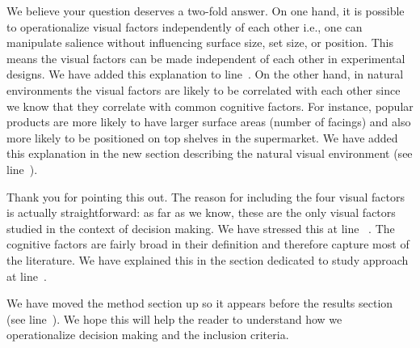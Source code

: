 
We believe your question deserves a two-fold answer. On one hand, it is possible to operationalize visual factors independently of each other i.e., one can manipulate salience without influencing surface size, set size, or position. This means the visual factors can be made independent of each other in experimental designs. We have added this explanation to line~. On the other hand, in natural environments the visual factors are likely to be correlated with each other since we know that they correlate with common cognitive factors. For instance, popular products are more likely to have larger surface areas (number of facings) and also more likely to be positioned on top shelves in the supermarket. We have added this explanation in the new section describing the natural visual environment (see line~). 



Thank you for pointing this out. The reason for including the four visual factors is actually straightforward: as far as we know, these are the only visual factors studied in the context of decision making. We have stressed this at line ~. The cognitive factors are fairly broad in their definition and therefore capture most of the literature. We have explained this in the section dedicated to study approach at line~.



We have moved the method section up so it appears before the results section (see line~). We hope this will help the reader to understand how we operationalize decision making and the inclusion criteria.  



